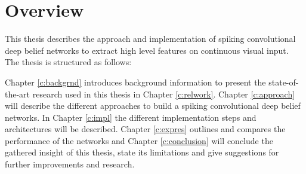 \section{Overview} \label{c:overw}

This thesis describes the approach and implementation of spiking convolutional deep belief networks to extract high level features on continuous visual input. The thesis is structured as follows:

Chapter \ref{c:backgrnd} introduces background information to present the state-of-the-art research used in this thesis in Chapter \ref{c:relwork}. 
Chapter \ref{c:approach} will describe the different approaches to build a spiking convolutional deep belief networks. 
In Chapter \ref{c:impl} the different implementation steps and architectures will be described. 
Chapter \ref{c:expres} outlines and compares the performance of the networks and 
Chapter \ref{c:conclusion} will conclude the gathered insight of this thesis, state its limitations and give suggestions for further improvements and research.  